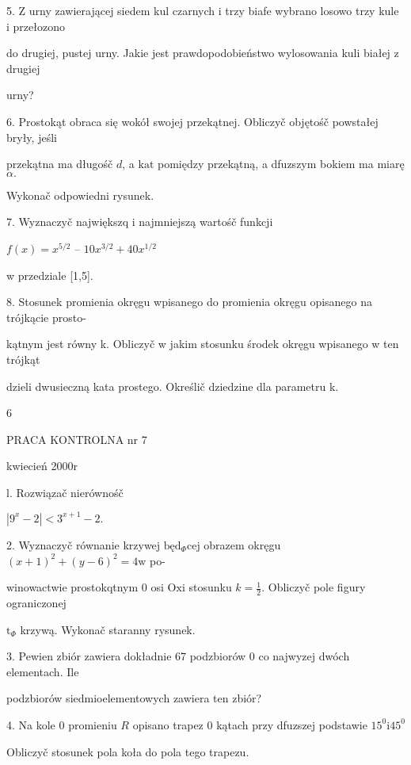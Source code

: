\documentclass[a4paper,12pt]{article}
\begin{document}
5. $\mathrm{Z}$ urny zawierającej siedem kul czarnych $\mathrm{i}$ trzy biafe wybrano losowo trzy kule $\mathrm{i}$ przełozono

do drugiej, pustej urny. Jakie jest prawdopodobieństwo wylosowania kuli białej $\mathrm{z}$ drugiej

urny?

6. Prostokąt obraca się wokół swojej przekątnej. Obliczyč objętośč powstałej bryły, jeśli

przekątna ma długośč $d$, a $\mathrm{k}\mathrm{a}\mathrm{t}$ pomiędzy przekątną, a dfuzszym bokiem ma miarę $\alpha.$

Wykonač odpowiedni rysunek.

7. Wyznaczyč największq $\mathrm{i}$ najmniejszą wartośč funkcji

$f(x) =x^{5/2}$ -- $10x^{3/2}+40x^{1/2}$

w przedziale [1,5].

8. Stosunek promienia okręgu wpisanego do promienia okręgu opisanego na trójkącie prosto-

kątnym jest równy k. Obliczyč w jakim stosunku środek okręgu wpisanego w ten trójkąt

dzieli dwusieczną kata prostego. Określič dziedzine dla parametru k.

6





PRACA KONTROLNA nr 7

kwiecień 2000r

l. Rozwiązač nierównośč

$|9^{x}-2|<3^{x+1}-2.$

2. Wyznaczyč równanie krzywej $\mathrm{b}\text{ę} \mathrm{d}_{\Phi}\mathrm{c}\mathrm{e}\mathrm{j}$ obrazem okręgu $(x+1)^{2}+(y-6)^{2}=4\mathrm{w}$ po-

winowactwie prostokqtnym $0$ osi $\mathrm{O}\mathrm{x}\mathrm{i}$ stosunku $k=\displaystyle \frac{1}{2}$. Obliczyč pole figury ograniczonej

$\mathrm{t}_{\Phi}$ krzywą. Wykonač staranny rysunek.

3. Pewien zbiór zawiera dokładnie 67 podzbiorów $0$ co najwyzej dwóch elementach. Ile

podzbiorów siedmioelementowych zawiera ten zbiór?

4. Na kole $0$ promieniu $R$ opisano trapez $0$ kątach przy dfuzszej podstawie $15^{0} \mathrm{i} 45^{0}$

Obliczyč stosunek pola koła do pola tego trapezu.
\end{document}
